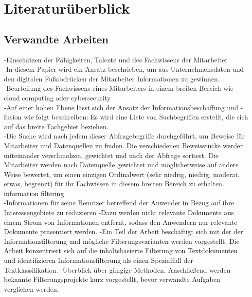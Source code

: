 \chapter{Literaturüberblick}
\label{chap:literaturüberblick}

\section{Verwandte Arbeiten}

-Einschätzen der Fähigkeiten, Talente und des Fachwissens der Mitarbeiter\\
-In diesem Papier wird ein Ansatz beschrieben, um aus Unternehmensdaten und den digitalen Fußabdrücken der Mitarbeiter Informationen zu gewinnen.\\
-Beurteilung des Fachwissens eines Mitarbeiters in einem breiten Bereich wie cloud computing oder cybersecurity\\
-Auf einer hohen Ebene lässt sich der Ansatz der Informationsbeschaffung und -fusion wie folgt beschreiben: Es wird eine Liste von Suchbegriffen erstellt, die sich auf das breite Fachgebiet beziehen.\\
-Die Suche wird nach jedem dieser Abfragebegriffe durchgeführt, um Beweise für Mitarbeiter und Datenquellen zu finden. Die verschiedenen Beweisstücke werden miteinander verschmolzen, gewichtet und nach der Abfrage sortiert. Die Mitarbeiter werden nach Datenquelle gewichtet und möglicherweise auf andere Weise bewertet, um einen einzigen Ordinalwert (sehr niedrig, niedrig, moderat, etwas, begrenzt) für ihr Fachwissen in diesem breiten Bereich zu erhalten.\cite{horesh2016information} \\

information filtering\\
-Informationen für seine Benutzer betreffend der Anwender in Bezug auf ihre Interessengebiete zu reduzieren
-Dazu werden nicht relevante Dokumente aus einem Strom von Informationen entfernt, sodass den Anwendern nur relevante Dokumente präsentiert werden.
-Ein Teil der Arbeit beschäftigt sich mit der der Informationsfilterung und mögliche Filterungsvarianten werden vorgestellt. Die Arbeit konzentriert sich auf die inhaltsbasierte Filterung von Textdokumenten und identifizieren Informationsfilterung als einen Spezialfall der Textklassifikation.
-Überblick über gängige Methoden. Anschließend werden bekannte Filterungsprojekte kurz vorgestellt, bevor verwandte Aufgaben verglichen werden.
\cite{lanquillon2001enhancing}

